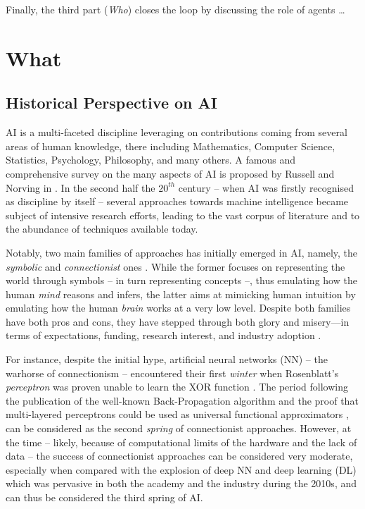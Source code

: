 \documentclass[12pt,a4paper,openright,twoside]{book}
\begin{document}
Finally, the third part (\emph{Who}) closes the loop by discussing the role of agents \ldots
{}


\part{What}
\label{part:what}

\chapter{Historical Perspective on AI}

AI is a multi-faceted discipline leveraging on contributions coming from several areas of human knowledge, there including Mathematics, Computer Science, Statistics, Psychology, Philosophy, and many others.
%
A famous and comprehensive survey on the many aspects of AI is proposed by Russell and Norving in \cite{russell2016artificial}.
%
In the second half the $20^{th}$ century -- when AI was firstly recognised as discipline by itself -- several approaches towards machine intelligence became subject of intensive research efforts, leading to the vast corpus of literature and to the abundance of techniques available today.

Notably, two main families of approaches has initially emerged in AI, namely, the \emph{symbolic} and \emph{connectionist} ones \cite{Smolensky1987, SUN2001783}.
%
While the former focuses on representing the world through symbols -- in turn representing concepts --, thus emulating how the human \emph{mind} reasons and infers, the latter aims at mimicking human intuition by emulating how the human \emph{brain} works at a very low level.
%
Despite both families have both pros and cons, they have stepped through both glory and misery---in terms of expectations, funding, research interest, and industry adoption \cite{Hendler2008, russell2016artificial}.

For instance, despite the initial hype, artificial neural networks (NN) -- the warhorse of connectionism -- encountered their first \emph{winter} when Rosenblatt's \emph{perceptron} \cite{rosenblatt1957perceptron} was proven unable to learn the XOR function \cite{Minsky1988}.
%
The period following the publication of the well-known Back-Propagation algorithm \cite{Bryson1979} and the proof that multi-layered perceptrons could be used as universal functional approximators \cite{Cybenko1989}, can be considered as the second \emph{spring} of connectionist approaches.
%
However, at the time -- likely, because of computational limits of the hardware and the lack of data -- the success of connectionist approaches can be considered very moderate, especially when compared with the explosion of deep NN and deep learning (DL) \cite{goodfellow2016deep} which was pervasive in both the academy and the industry during the 2010s, and can thus be considered the third spring of AI.
\end{document}
